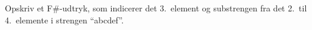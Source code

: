 Opskriv et F\#-udtryk, som indicerer det 3.\ element og substrengen fra det 2.\ til 4.\ elemente i strengen ``abcdef''.
